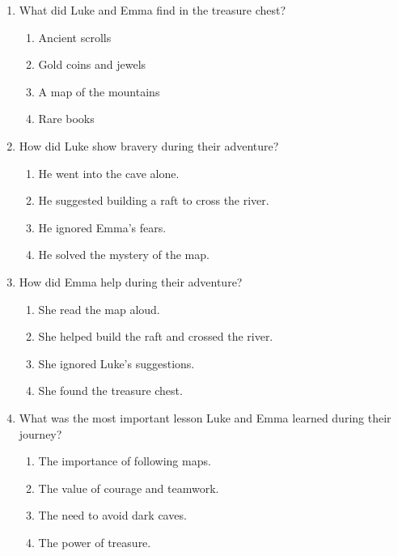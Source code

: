 \documentclass[12pt]{article}
\begin{document}
\begin{enumerate}
\vspace{0.5cm}

\item What did Luke and Emma find in the treasure chest?

\begin{enumerate}[label=\Alph*.]
    \item Ancient scrolls
    \item Gold coins and jewels
    \item A map of the mountains
    \item Rare books
\end{enumerate}

\vspace{0.5cm}

\item How did Luke show bravery during their adventure?

\begin{enumerate}[label=\Alph*.]
    \item He went into the cave alone.
    \item He suggested building a raft to cross the river.
    \item He ignored Emma’s fears.
    \item He solved the mystery of the map.
\end{enumerate}

\vspace{0.5cm}

\item How did Emma help during their adventure?

\begin{enumerate}[label=\Alph*.]
    \item She read the map aloud.
    \item She helped build the raft and crossed the river.
    \item She ignored Luke’s suggestions.
    \item She found the treasure chest.
\end{enumerate}

\vspace{0.5cm}

\item What was the most important lesson Luke and Emma learned during their journey?

\begin{enumerate}[label=\Alph*.]
    \item The importance of following maps.
    \item The value of courage and teamwork.
    \item The need to avoid dark caves.
    \item The power of treasure.
\end{enumerate}


\end{enumerate}
\end{document}
